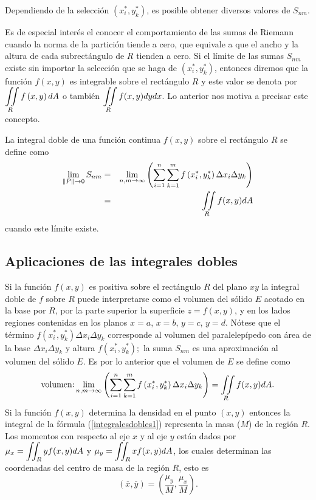 Dependiendo de la selección $\left( x_{i}^{\ast },y_{k}^{\ast }\right) $,
es posible obtener diversos valores de $S_{nm}$.

Es de especial interés el conocer el comportamiento de las sumas de
Riemann cuando la norma de la partición tiende a cero, que equivale a
que el ancho y la altura de cada subrectángulo de $R$ tienden a cero.
Si el límite de las sumas $S_{nm}$ existe sin importar la selección
que se haga de $\left( x_{i}^{\ast },y_{k}^{\ast }\right) $, entonces
diremos que la función $f(x,y) $ es integrable sobre el rectángulo $R$
y este valor se denota por
$\displaystyle \iint\limits_{R}f\left(x,y\right) dA$ o también $\displaystyle \iint\limits_{R}f(x,y) dydx$.
Lo anterior nos motiva a precisar este concepto.

\begin{defi}
La integral doble de una función continua $f(x,y)$ sobre el rectángulo $R$ se define como
\begin{eqnarray} \label{integralesdobles1}
\lim _{\left\Vert P\right\Vert \to 0} S_{nm} &=& \lim _{n,m \to \infty}\left(\sum_{i=1}^{n}\sum_{k=1}^{m}f\left( x_{i}^{\ast },y_{k}^{\ast}\right) \Delta x_{i}\Delta y_{k}\right) \nonumber \\ &=& \displaystyle \iint\limits_{R}f(x,y) dA
\end{eqnarray}
cuando este límite existe.
\end{defi}

\subsection{Aplicaciones de las integrales dobles}

Si la función $f(x,y)$ es positiva sobre el rectángulo $R$ del plano $xy$ la integral doble de $f$ sobre $R$ puede
interpretarse como el volumen del sólido $E$ acotado en la base por $R$,
por la parte superior la superficie $z=f(x,y)$, y en los lados regiones contenidas en
los planos $x=a$, $x=b$, $y=c$, $y=d$. Nótese que el término
$f(x_{i}^{\ast },y_{k}^{\ast })\Delta x_{i}\Delta y_{k}$ corresponde al
volumen del paralelepípedo con área de la base $\Delta x_{i}\Delta y_{k}$ y altura $f(x_{i}^{\ast },y_{k}^{\ast });$
la suma $S_{nm}$ es una aproximación al volumen del sólido $E$.
Es por lo anterior que el volumen de $E$ se define como
\[\text{volumen:}\lim _{n,m \to \infty}\left(\sum_{i=1}^{n}\sum_{k=1}^{m}f\left( x_{i}^{\ast },y_{k}^{\ast}\right) \Delta x_{i}\Delta y_{k}\right)= \displaystyle \iint\limits_{R}f(x,y) dA.\] 
Si la función $f(x,y)$ determina la densidad en el punto $(x,y)$ entonces la integral de la fórmula (\ref{integralesdobles1})
representa la masa ($M$) de la región $R$. Los momentos con respecto al eje $x$ y al eje $y$ están dados  por
{\small $\mu_{x}=\displaystyle \iint_R y f(x,y)dA$} y {\small $\mu_{y}=\displaystyle \iint_R x f(x,y)dA$,} los cuales determinan las coordenadas del
centro de masa de la región $R$, esto es $$(\overline{x},\overline{y})= \left(\frac{\mu_y}{M},\frac{\mu_x}{M}\right)\!.$$

